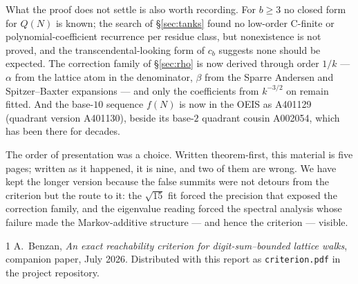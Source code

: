\documentclass[11pt]{article}
\theoremstyle{definition}
\theoremstyle{remark}
\begin{document}
What the proof does not settle is also worth recording. For $b\ge3$ no closed
form for $Q(N)$ is known; the search of \S\ref{sec:tanks} found no low-order
C-finite or polynomial-coefficient recurrence per residue class, but
nonexistence is not proved, and the transcendental-looking form of $c_b$
suggests none should be expected. The correction family of \S\ref{sec:rho} is
now derived through order $1/k$ --- $\alpha$ from the lattice atom in the
denominator, $\beta$ from the Sparre Andersen and Spitzer--Baxter expansions
--- and only the coefficients from $k^{-3/2}$ on remain fitted. And the
base-$10$ sequence $f(N)$
is now in the OEIS as A401129 (quadrant version A401130), beside its base-$2$
quadrant cousin A002054, which has been there for decades.

The order of presentation was a choice. Written theorem-first, this material
is five pages; written as it happened, it is nine, and two of them are wrong.
We have kept the longer version because the false summits were not detours
from the criterion but the route to it: the $\sqrt{15}$ fit forced the
precision that exposed the correction family, and the eigenvalue reading
forced the spectral analysis whose failure made the Markov-additive structure
--- and hence the criterion --- visible.

\begin{thebibliography}{1}
A.~Benzan, \emph{An exact reachability criterion for digit-sum--bounded lattice
walks}, companion paper, July 2026. Distributed with this report as
\texttt{criterion.pdf} in the project repository.
\end{thebibliography}
\end{document}
